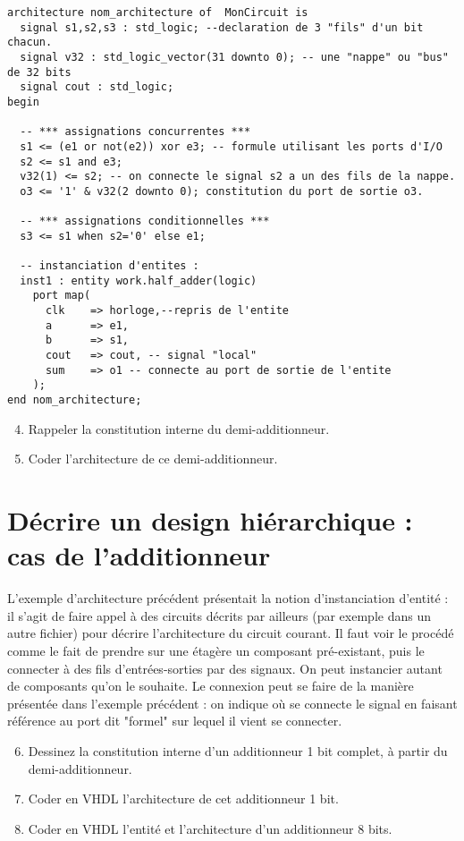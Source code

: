 \documentclass[a4paper,11pt]{article}
\begin{document}
\begin{lstlisting}
architecture nom_architecture of  MonCircuit is
  signal s1,s2,s3 : std_logic; --declaration de 3 "fils" d'un bit chacun.
  signal v32 : std_logic_vector(31 downto 0); -- une "nappe" ou "bus" de 32 bits
  signal cout : std_logic;
begin

  -- *** assignations concurrentes ***
  s1 <= (e1 or not(e2)) xor e3; -- formule utilisant les ports d'I/O
  s2 <= s1 and e3;
  v32(1) <= s2; -- on connecte le signal s2 a un des fils de la nappe.
  o3 <= '1' & v32(2 downto 0); constitution du port de sortie o3.

  -- *** assignations conditionnelles ***
  s3 <= s1 when s2='0' else e1;

  -- instanciation d'entites :
  inst1 : entity work.half_adder(logic)
    port map(
      clk    => horloge,--repris de l'entite
      a      => e1,
      b      => s1,
      cout   => cout, -- signal "local"
      sum    => o1 -- connecte au port de sortie de l'entite
    );
end nom_architecture;
\end{lstlisting}

\begin{enumerate}
  \setcounter{enumi}{3}
  \item Rappeler la constitution interne du demi-additionneur.
  \item Coder l'architecture de ce demi-additionneur.
\end{enumerate}

\section{Décrire un design hiérarchique : cas de l'additionneur}

L'exemple d'architecture précédent présentait la notion d'instanciation d'entité : il s'agit de faire appel à des circuits décrits par ailleurs (par exemple dans un
autre fichier) pour décrire l'architecture du circuit courant. Il faut voir le procédé comme le fait de prendre sur une étagère un composant pré-existant, puis
le connecter à des fils d'entrées-sorties par des signaux. On peut instancier autant de composants qu'on le souhaite. Le connexion peut se faire de la manière présentée
dans l'exemple précédent : on indique où se connecte le signal en faisant référence au port dit "formel" sur lequel il vient se connecter.

\begin{enumerate}
  \setcounter{enumi}{5}
  \item Dessinez la constitution interne d'un additionneur 1 bit complet, à partir du demi-additionneur.
  \item Coder en VHDL l'architecture de cet additionneur 1 bit.
  \item Coder en VHDL l'entité et l'architecture d'un additionneur 8 bits.
\end{enumerate}
\end{document}
